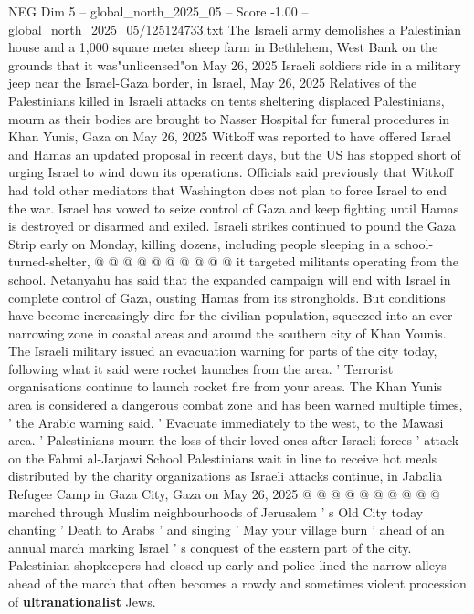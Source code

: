 \begin{textsample}{NEG Dim 5 – global\_north\_2025\_05 – Score -1.00 – global\_north\_2025\_05/125124733.txt}  \label{ex:f5_neg_321}
The Israeli army demolishes a Palestinian house and a 1,000 square meter sheep farm in Bethlehem, West Bank on the grounds that it was"unlicensed"on May 26, 2025 Israeli soldiers ride in a military jeep near the Israel-Gaza border, in Israel, May 26, 2025 Relatives of the Palestinians killed in Israeli attacks on tents sheltering displaced Palestinians, mourn as their bodies are brought to Nasser Hospital for funeral procedures in Khan Yunis, Gaza on May 26, 2025 Witkoff was reported to have offered Israel and Hamas an updated proposal in recent days, but the US has stopped short of urging Israel to wind down its operations.
Officials said previously that Witkoff had told other mediators that Washington does not plan to force Israel to end the war.
Israel has vowed to seize control of Gaza and keep fighting until Hamas is destroyed or disarmed and exiled.
Israeli strikes continued to pound the Gaza Strip early on Monday, killing dozens, including people sleeping in a school-turned-shelter, @ @ @ @ @ @ @ @ @ @ it targeted militants operating from the school.
Netanyahu has said that the expanded campaign will end with Israel in complete control of Gaza, ousting Hamas from its strongholds.
But conditions have become increasingly dire for the civilian population, squeezed into an ever-narrowing zone in coastal areas and around the southern city of Khan Younis.
The Israeli military issued an evacuation warning for parts of the city today, following what it said were rocket launches from the area. ' Terrorist organisations continue to launch rocket fire from your areas.
The Khan Yunis area is considered a dangerous combat zone and has been warned multiple times, ' the Arabic warning said. ' Evacuate immediately to the west, to the Mawasi area. ' Palestinians mourn the loss of their loved ones after Israeli forces ' attack on the Fahmi al-Jarjawi School Palestinians wait in line to receive hot meals distributed by the charity organizations as Israeli attacks continue, in Jabalia Refugee Camp in Gaza City, Gaza on May 26, 2025 @ @ @ @ @ @ @ @ @ @ marched through Muslim neighbourhoods of Jerusalem ' s Old City today chanting ' Death to Arabs ' and singing ' May your village burn ' ahead of an annual march marking Israel ' s conquest of the eastern part of the city.
Palestinian shopkeepers had closed up early and police lined the narrow alleys ahead of the march that often becomes a rowdy and sometimes violent procession of \textbf{ultranationalist} Jews.

\end{textsample}

